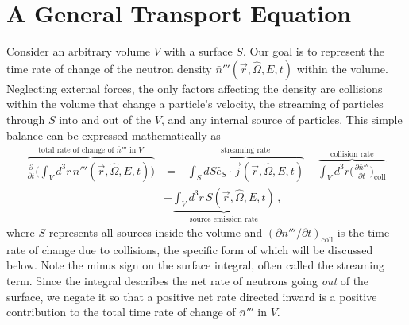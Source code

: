 
\section{A General Transport Equation}

Consider an arbitrary volume $V$ with a surface $S$.  Our goal is to represent 
the time rate of change of the neutron 
density $\bar{n}'''(\vec{r},\hat{\Omega},E,t)$ within the volume.  Neglecting
external forces, the only factors affecting the density are collisions within 
the volume that change a particle's velocity, the streaming of particles 
through $S$ into and out of the $V$, and any internal source of particles.  
This simple balance can be expressed mathematically as
\begin{equation}
\begin{split}
 \overbrace{ \frac{\partial}{\partial t} \Bigg ( \int_V d^3r\, \bar{n}'''(\vec{r},\hat{\Omega},E,t) \Bigg ) }^{\text{total rate of change of }\bar{n}'''\text{ in } V} 
      &=  - \overbrace{\int_S dS \hat{e}_S \cdot \vec{j}(\vec{r},\hat{\Omega},E,t) }^{\text{streaming rate}}
       + \overbrace{ \int_V d^3 r \Big( \frac{\partial \bar{n}'''}{\partial t} \Big )_{\mathrm{coll}} }^{\text{collision rate}} \\
      &+ \underbrace{ \int_V d^3 r \, S(\vec{r},\hat{\Omega},E,t) }_{\text{source emission rate}}  \, ,
\end{split}
\label{eq:balance}
\end{equation}
where $S$ represents all sources inside the volume and 
$(\partial \bar{n}'''/\partial t)_{\mathrm{coll}}$ is the time rate 
of change due to collisions, the specific form of which will be discussed 
below.  Note the minus sign on the surface integral, often called the streaming 
term.  Since the integral describes the net rate of neutrons going \textit{out} 
of the surface, we negate it so that a positive net rate directed inward is a 
positive contribution to the total time rate of change of $\bar{n}'''$ in $V$.

